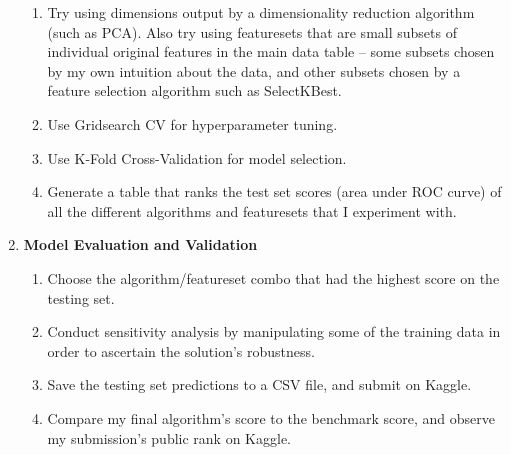 \documentclass[12pt, letterpaper]{article}
\begin{document}
\begin{enumerate}
    \begin{enumerate}
      \item Try using dimensions output by a dimensionality reduction algorithm (such as PCA). Also try using featuresets that are small subsets of individual original features in the main data table --  some subsets chosen by my own intuition about the data, and other subsets chosen by a feature selection algorithm such as SelectKBest.
      \item Use Gridsearch CV for hyperparameter tuning.
      \item Use K-Fold Cross-Validation for model selection.
      \item Generate a table that ranks the test set scores (area under ROC curve) of all the different algorithms and featuresets that I experiment with.
    \end{enumerate}
  \item \textbf{Model Evaluation and Validation}
    \begin{enumerate}
      \item Choose the algorithm/featureset combo that had the highest score on the testing set.
      \item Conduct sensitivity analysis by manipulating some of the training data in order to ascertain the solution's robustness.
      \item Save the testing set predictions to a CSV file, and submit on Kaggle.
      \item Compare my final algorithm's score to the benchmark score, and observe my submission's public rank on Kaggle.
    \end{enumerate}
\end{enumerate}

\renewcommand{\labelenumi}{\arabic{enumi}}
\end{document}
